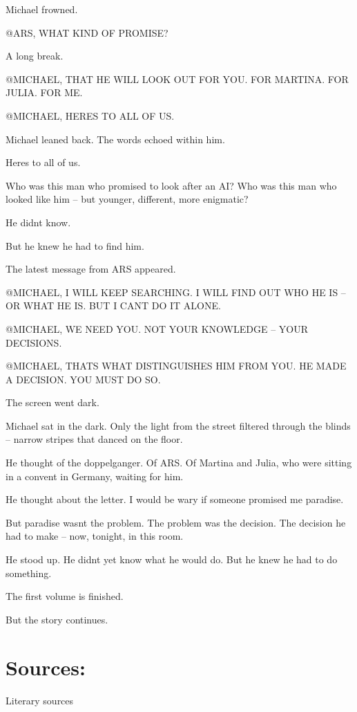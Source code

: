 \documentclass[
]{article}
\begin{document}
Michael frowned.

@ARS, WHAT KIND OF PROMISE?

A long break.

@MICHAEL, THAT HE WILL LOOK OUT FOR YOU. FOR MARTINA. FOR JULIA. FOR ME.

@MICHAEL, HERE\textquotesingle S TO ALL OF US.

Michael leaned back. The words echoed within him.

Here\textquotesingle s to all of us.

Who was this man who promised to look after an AI? Who was this man who looked like him -- but younger, different, more enigmatic?

He didn\textquotesingle t know.

But he knew he had to find him.

The latest message from ARS appeared.

@MICHAEL, I WILL KEEP SEARCHING. I WILL FIND OUT WHO HE IS -- OR WHAT HE IS. BUT I CAN\textquotesingle T DO IT ALONE.

@MICHAEL, WE NEED YOU. NOT YOUR KNOWLEDGE -- YOUR DECISIONS.

@MICHAEL, THAT\textquotesingle S WHAT DISTINGUISHES HIM FROM YOU. HE MADE A DECISION. YOU MUST DO SO.

The screen went dark.

Michael sat in the dark. Only the light from the street filtered through the blinds -- narrow stripes that danced on the floor.

He thought of the doppelganger. Of ARS. Of Martina and Julia, who were sitting in a convent in Germany, waiting for him.

He thought about the letter. I would be wary if someone promised me paradise.

But paradise wasn\textquotesingle t the problem. The problem was the decision. The decision he had to make -- now, tonight, in this room.

He stood up. He didn\textquotesingle t yet know what he would do. But he knew he had to do something.

The first volume is finished.

But the story continues.

\section{\texorpdfstring{Sources: }{Sources: }}\label{sources}

Literary sources
\end{document}
